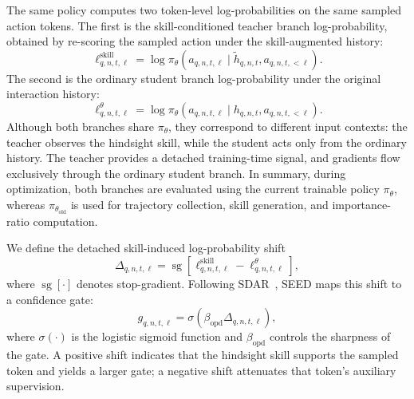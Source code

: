 The same policy computes two token-level log-probabilities on the same sampled action tokens. The first is the skill-conditioned teacher branch log-probability, obtained by re-scoring the sampled action under the skill-augmented history:
\[
\ell^{\mathrm{skill}}_{q,n,t,\ell}
=
\log
\pi_{\theta}
\left(
a_{q,n,t,\ell}
\mid
\tilde{h}_{q,n,t},
a_{q,n,t,<\ell}
\right).
\]
The second is the ordinary student branch log-probability under the original interaction history:
\[
\ell^{\theta}_{q,n,t,\ell}
=
\log
\pi_{\theta}
\left(
a_{q,n,t,\ell}
\mid
h_{q,n,t},
a_{q,n,t,<\ell}
\right).
\]
Although both branches share $\pi_\theta$, they correspond to different input contexts: the teacher observes the hindsight skill, while the student acts only from the ordinary history. The teacher provides a detached training-time signal, and gradients flow exclusively through the ordinary student branch. In summary, during optimization, both branches are evaluated using the current trainable policy $\pi_\theta$, whereas $\pi_{\theta_{\mathrm{old}}}$ is used for trajectory collection, skill generation, and importance-ratio computation.



We define the detached skill-induced log-probability shift
\[
\Delta_{q,n,t,\ell}
=
\operatorname{sg}
\left[
\ell^{\mathrm{skill}}_{q,n,t,\ell}
-
\ell^{\theta}_{q,n,t,\ell}
\right],
\]
where $\operatorname{sg}[\cdot]$ denotes stop-gradient. Following SDAR~\citep{lu2026sdar}, SEED maps this shift to a confidence gate:
\[
g_{q,n,t,\ell}
=
\sigma
\left(
\beta_{\mathrm{opd}}
\Delta_{q,n,t,\ell}
\right),
\]
where $\sigma(\cdot)$ is the logistic sigmoid function and $\beta_{\mathrm{opd}}$ controls the sharpness of the gate. A positive shift indicates that the hindsight skill supports the sampled token and yields a larger gate; a negative shift attenuates that token's auxiliary supervision.

